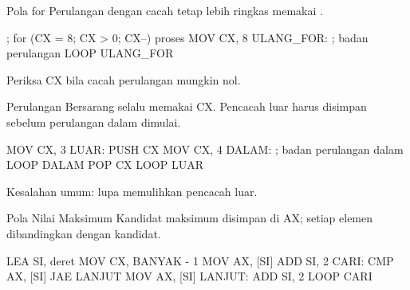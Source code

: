 \documentclass[aspectratio=169,11pt]{beamer}
\begin{document}
\begin{frame}[fragile]{Pola for}
\small
Perulangan  dengan cacah tetap lebih ringkas memakai
.

\vspace{0.2em}
\begin{kodeasm}[numbers=none]
; for (CX = 8; CX > 0; CX--) { proses }
MOV CX, 8
ULANG_FOR:
    ; badan perulangan
    LOOP ULANG_FOR
\end{kodeasm}

\vspace{0.15em}
{\footnotesize\color{obeGray}Periksa CX bila cacah perulangan mungkin
nol.\par}
\end{frame}

\begin{frame}[fragile]{Perulangan Bersarang}
\small
{} selalu memakai CX. Pencacah luar harus disimpan sebelum
perulangan dalam dimulai.

\vspace{0.2em}
\begin{kodeasm}[numbers=none]
MOV CX, 3
LUAR:
    PUSH CX
    MOV CX, 4
DALAM:
    ; badan perulangan dalam
    LOOP DALAM
    POP CX
    LOOP LUAR
\end{kodeasm}

\vspace{0.1em}
{\footnotesize\color{obeMaroon}Kesalahan umum: lupa memulihkan
pencacah luar.\par}
\end{frame}

\begin{frame}[fragile]{Pola Nilai Maksimum}
\small
Kandidat maksimum disimpan di AX; setiap elemen dibandingkan dengan
kandidat.

\vspace{0.2em}
\begin{kodeasm}[numbers=none]
LEA SI, deret
MOV CX, BANYAK - 1
MOV AX, [SI]
ADD SI, 2
CARI:
    CMP AX, [SI]
    JAE LANJUT
    MOV AX, [SI]
LANJUT:
    ADD SI, 2
    LOOP CARI
\end{kodeasm}
\end{frame}
\end{document}
